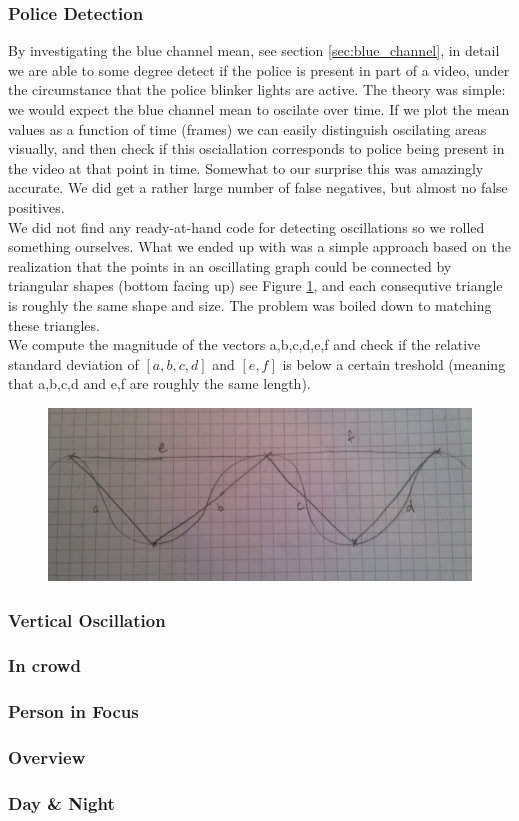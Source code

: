\subsubsection{Police Detection}\label{sec:police_detection}
%
By investigating the blue channel mean, see section \ref{sec:blue_channel}, in detail we are able to some degree detect if the police is present in part of a video, under the circumstance that the police blinker lights are active. The theory was simple: we would expect the blue channel mean to oscilate over time. If we plot the mean values as a function of time (frames) we can easily distinguish oscilating areas visually, and then check if this osciallation corresponds to police being present in the video at that point in time. Somewhat to our surprise this was amazingly accurate. We did get a rather large number of false negatives, but almost no false positives.\\
We did not find any ready-at-hand code for detecting oscillations so we rolled something ourselves. What we ended up with was a simple approach based on the realization that the points in an oscillating graph could be connected by triangular shapes (bottom facing up) see Figure \ref{fig:triangles}, and each consequtive triangle is roughly the same shape and size. The problem was boiled down to matching these triangles.\\
We compute the magnitude of the vectors a,b,c,d,e,f and check if the relative standard deviation of $[a,b,c,d]$ and $[e,f]$ is below a certain treshold (meaning that a,b,c,d and e,f are roughly the same length).
%
\begin{figure}
     \centering
     \includegraphics[width=1.05\textwidth]{img/triangles.jpg}
     \caption{}\label{fig:triangles}
\end{figure}
% 
%
\subsubsection{Vertical Oscillation}
%

%
\subsubsection{In crowd}
%

%
\subsubsection{Person in Focus}
%

%
\subsubsection{Overview}
%

%
\subsubsection{Day \& Night}
%
